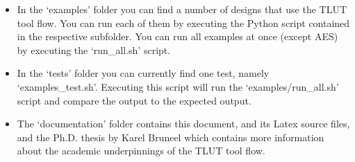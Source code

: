 \documentclass[a4paper,oneside]{memoir}
\begin{document}
\begin{itemize}
\item In the `examples' folder you can find a number of designs that use the TLUT tool flow. You can run each of them by executing the Python script contained in the respective subfolder. You can run all examples at once (except AES) by executing the `run\_all.sh' script.
\item In the `tests' folder you can currently find one test, namely `examples\_test.sh'. Executing this script will run the `examples/run\_all.sh' script and compare the output to the expected output.
\item The `documentation' folder contains this document, and its Latex source files, and the Ph.D. thesis by Karel Bruneel which contains more information about the academic underpinnings of the TLUT tool flow.
\end{itemize}
\end{document}
